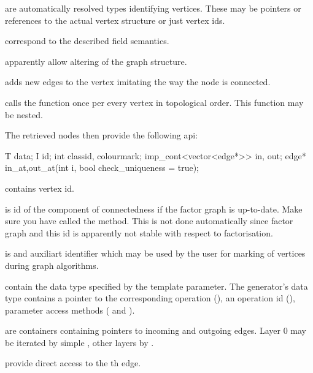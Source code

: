 \begin{description}
  \item {} are automatically resolved types identifying vertices. These may be pointers or references to the actual vertex structure or just vertex ids.
  \item {} correspond to the described field semantics.
  \item {} apparently allow altering of the graph structure.
  \item {} adds new edges to the vertex  imitating the way the  node is connected.
  \item {} calls the function  once per every vertex in topological order. This function may be nested.
\end{description}

The retrieved nodes then provide the following api:
\begin{code}
T data; I id;
int classid, colourmark; 
imp_cont<vector<edge*>> in, out;
edge* in_at,out_at(int i, bool check_uniqueness = true);
\end{code}

\begin{description}
  \item {} contains vertex id.
  \item {} is id of the component of connectedness if the factor graph is up-to-date. Make sure you have called the  method. This is not done automatically since factor graph and this id is apparently not stable with respect to factorisation.
  \item {} is and auxiliart identifier which may be used by the user for marking of vertices during graph algorithms.
  \item {} contain the data type specified by the  template parameter. The generator's data type contains a pointer to the corresponding operation (), an operation id (), parameter access methods ( and ). 
  \item {} are containers containing pointers to incoming and outgoing edges. Layer 0 may be iterated by simple , other layers by .
  \item {} provide direct access to the th edge.
\end{description}

